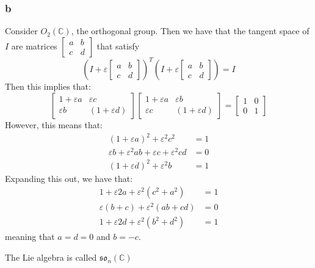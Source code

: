 \documentclass[]{article}
\begin{document}
\subsubsection*{b}
Consider $O_2(\mathbb{C})$, the orthogonal group. Then we have that the tangent space of $I$ are matrices $\begin{bmatrix}
	a & b \\
	c & d
\end{bmatrix}
$
that satisfy 
\begin{equation}
	\left(I + \varepsilon \begin{bmatrix}
		a & b \\
		c & d
	\end{bmatrix}\right)^T 
\left(I + \varepsilon \begin{bmatrix}
	a & b \\
	c & d
\end{bmatrix}\right)
 = I
\end{equation}
Then this implies that:
\begin{equation}
	\begin{bmatrix}
		1 + \varepsilon a & \varepsilon c\\
		\varepsilon b & (1 + \varepsilon d)
	\end{bmatrix}
	\begin{bmatrix}
	1 + \varepsilon a & \varepsilon b\\
	\varepsilon c & (1 + \varepsilon d)
\end{bmatrix}
= 
\begin{bmatrix}
	1 & 0\\
	0 & 1
\end{bmatrix}
\end{equation}
However, this means that:
\begin{align*}
	(1 + \varepsilon a)^2 + \varepsilon^2 c^2 &= 1\\
	\varepsilon b + \varepsilon^2 ab + \varepsilon c + \varepsilon^2 cd &= 0\\
	(1 + \varepsilon d)^2 + \varepsilon^2 b &= 1
\end{align*}
Expanding this out, we have that:
\begin{align*}
	1 + \varepsilon 2a + \varepsilon^2 (c^2 + a^2) &= 1\\
	\varepsilon (b + c) + \varepsilon^2 (ab + cd) &= 0\\
	1 + \varepsilon 2d + \varepsilon^2 (b^2 + d^2) &= 1
\end{align*}
meaning that $a = d = 0$ and $b = -c$. 

The Lie algebra is called $\mathfrak{so}_n(\mathbb{C})$ 
\end{document}
